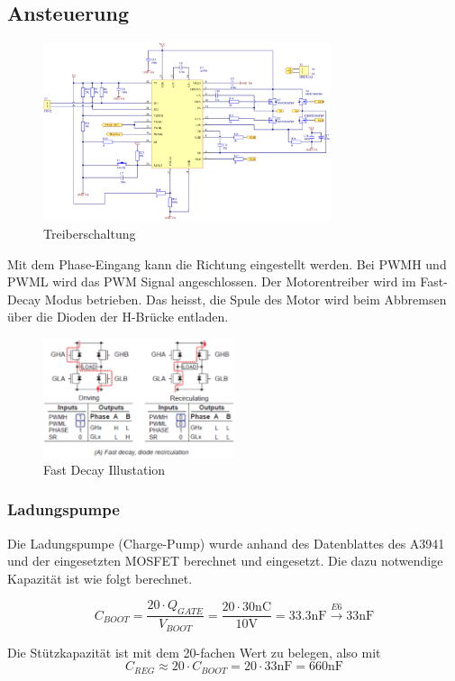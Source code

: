 \subsection{Ansteuerung}

\begin{figure}[h!]
	\centering
	\includegraphics[width=0.75\textwidth]{src/dc/fig/driver_schematic.png}
	\caption{Treiberschaltung}
\end{figure}

Mit dem Phase-Eingang kann die Richtung eingestellt werden. Bei PWMH und
PWML wird das PWM Signal angeschlossen. Der Motorentreiber wird im
Fast-Decay Modus betrieben. Das heisst, die Spule des Motor wird beim
Abbremsen über die Dioden der H-Brücke entladen.

\begin{figure}[h!]
	\centering
	\includegraphics[width=0.5\textwidth]{src/dc/fig/decay.png}
	\caption{Fast Decay Illustation}
\end{figure}

\subsubsection{Ladungspumpe}
Die Ladungspumpe (Charge-Pump) wurde anhand des Datenblattes des A3941
und der eingesetzten MOSFET berechnet und eingesetzt. Die dazu notwendige
Kapazität ist wie folgt berechnet.

\[  
	C_{BOOT}
		= \frac{20 \cdot Q_{GATE}}{V_{BOOT}}
		= \frac{20 \cdot 30\mathrm{nC}}{10\mathrm{V}}
		= 33.3\mathrm{nF} 
		\xrightarrow{E6} 33\mathrm{nF}
\]

\noindent
Die Stützkapazität ist mit dem 20-fachen Wert zu belegen, also mit
\[
	C_{REG}
		\approx 20 \cdot C_{BOOT}
		= 20 \cdot 33\mathrm{nF}
		= 660\mathrm{nF}
\]
